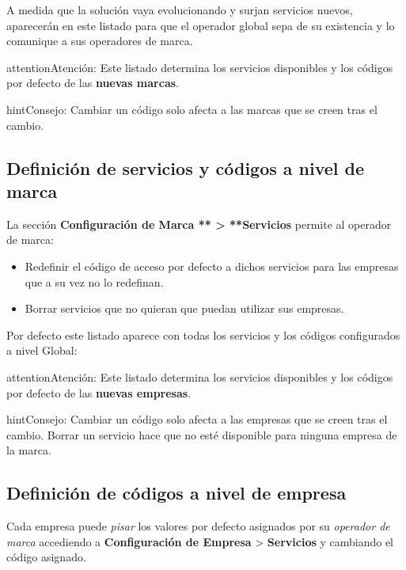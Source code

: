 \documentclass[letterpaper,10pt,spanish]{sphinxmanual}
\begin{document}
A medida que la solución vaya evolucionando y surjan servicios nuevos, aparecerán en este listado para que el operador global sepa de su existencia y lo comunique a sus operadores de marca.

\begin{notice}{attention}{Atención:}
Este listado determina los servicios disponibles y los códigos por defecto de las \textbf{nuevas marcas}.
\end{notice}

\begin{notice}{hint}{Consejo:}
Cambiar un código solo afecta a las marcas que se creen tras el cambio.
\end{notice}


\subsection{Definición de servicios y códigos a nivel de marca}
\label{pbx_features/services:definicion-de-servicios-y-codigos-a-nivel-de-marca}
La sección \textbf{Configuración de Marca ** \textgreater{} **Servicios} permite al operador de marca:
\begin{itemize}
\item {} 
Redefinir el código de acceso por defecto a dichos servicios para las empresas que a su vez no lo redefinan.

\item {} 
Borrar servicios que no quieran que puedan utilizar sus empresas.

\end{itemize}

Por defecto este listado aparece con todas los servicios y los códigos configurados a nivel Global:

\noindent{}

\begin{notice}{attention}{Atención:}
Este listado determina los servicios disponibles y los códigos por defecto de las \textbf{nuevas empresas}.
\end{notice}

\begin{notice}{hint}{Consejo:}
Cambiar un código solo afecta a las empresas que se creen tras el cambio. Borrar un servicio hace que no esté disponible para ninguna empresa de la marca.
\end{notice}


\subsection{Definición de códigos a nivel de empresa}
\label{pbx_features/services:definicion-de-codigos-a-nivel-de-empresa}
Cada empresa puede \emph{pisar} los valores por defecto asignados por su \emph{operador de marca} accediendo a \textbf{Configuración de Empresa} \textgreater{} \textbf{Servicios} y cambiando el código asignado.
\end{document}
